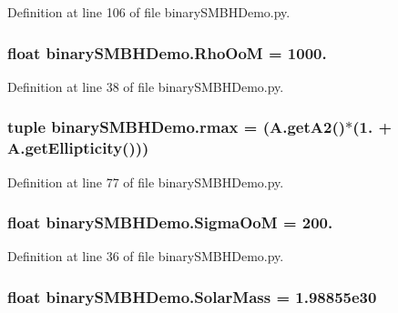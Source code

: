 Definition at line 106 of file binary\-S\-M\-B\-H\-Demo.\-py.

\hypertarget{namespacebinary_s_m_b_h_demo_a75a0a01864a83a97da7989e85d83d7de}{
\subsubsection[{Rho\-Oo\-M}]{\setlength{\rightskip}{0pt plus 5cm}float binary\-S\-M\-B\-H\-Demo.\-Rho\-Oo\-M = 1000.}}\label{namespacebinary_s_m_b_h_demo_a75a0a01864a83a97da7989e85d83d7de}


Definition at line 38 of file binary\-S\-M\-B\-H\-Demo.\-py.

\hypertarget{namespacebinary_s_m_b_h_demo_a74e4ce6514b15b46325ef6ae05f4a3f1}{
\subsubsection[{rmax}]{\setlength{\rightskip}{0pt plus 5cm}tuple binary\-S\-M\-B\-H\-Demo.\-rmax = (A.\-get\-A2()$\ast$(1. + A.\-get\-Ellipticity()))}}\label{namespacebinary_s_m_b_h_demo_a74e4ce6514b15b46325ef6ae05f4a3f1}


Definition at line 77 of file binary\-S\-M\-B\-H\-Demo.\-py.

\hypertarget{namespacebinary_s_m_b_h_demo_a3f75f288ba1950c26cff588479de1a34}{
\subsubsection[{Sigma\-Oo\-M}]{\setlength{\rightskip}{0pt plus 5cm}float binary\-S\-M\-B\-H\-Demo.\-Sigma\-Oo\-M = 200.}}\label{namespacebinary_s_m_b_h_demo_a3f75f288ba1950c26cff588479de1a34}


Definition at line 36 of file binary\-S\-M\-B\-H\-Demo.\-py.

\hypertarget{namespacebinary_s_m_b_h_demo_a3c430f8a1571165fd1d3b9180f3e428f}{
\subsubsection[{Solar\-Mass}]{\setlength{\rightskip}{0pt plus 5cm}float binary\-S\-M\-B\-H\-Demo.\-Solar\-Mass = 1.\-98855e30}}\label{namespacebinary_s_m_b_h_demo_a3c430f8a1571165fd1d3b9180f3e428f}


